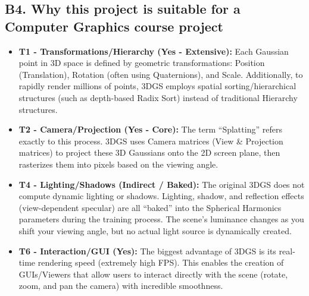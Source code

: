 \documentclass[a4paper,12pt]{article}
\begin{document}
\subsection*{B4. Why this project is suitable for a Computer Graphics course project}
\begin{itemize}[leftmargin=1.2em]
\item \textbf{T1 - Transformations/Hierarchy (Yes - Extensive):} Each Gaussian point in 3D space is defined by geometric transformations: Position (Translation), Rotation (often using Quaternions), and Scale. Additionally, to rapidly render millions of points, 3DGS employs spatial sorting/hierarchical structures (such as depth-based Radix Sort) instead of traditional Hierarchy structures.
\item \textbf{T2 - Camera/Projection (Yes - Core):} The term ``Splatting'' refers exactly to this process. 3DGS uses Camera matrices (View \& Projection matrices) to project these 3D Gaussians onto the 2D screen plane, then rasterizes them into pixels based on the viewing angle.
\item \textbf{T4 - Lighting/Shadows (Indirect / Baked):} The original 3DGS does not compute dynamic lighting or shadows. Lighting, shadow, and reflection effects (view-dependent specular) are all ``baked'' into the Spherical Harmonics parameters during the training process. The scene's luminance changes as you shift your viewing angle, but no actual light source is dynamically created.
\item \textbf{T6 - Interaction/GUI (Yes):} The biggest advantage of 3DGS is its real-time rendering speed (extremely high FPS). This enables the creation of GUIs/Viewers that allow users to interact directly with the scene (rotate, zoom, and pan the camera) with incredible smoothness.
\end{itemize}
\end{document}
